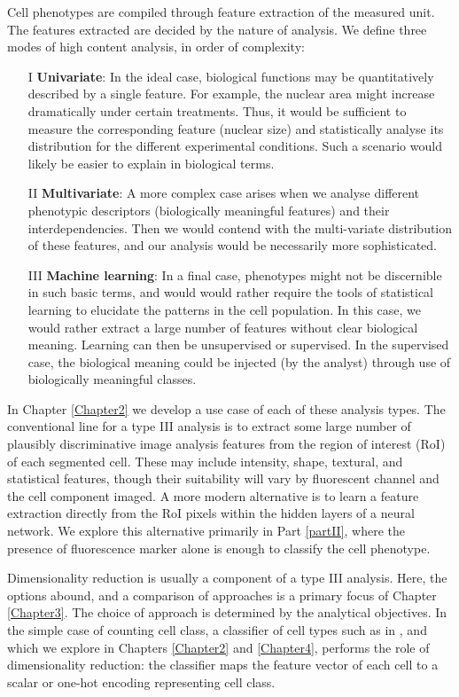 Cell phenotypes are compiled through feature extraction of the measured unit. The features extracted are decided by the nature of analysis. We define three modes of high content analysis, in order of complexity:

\begin{itemize}
\item[I] \textbf{Univariate}: In the ideal case, biological functions may be quantitatively described by a single feature. For example, the nuclear area might increase dramatically under certain treatments. Thus, it would be sufficient to measure the corresponding feature (nuclear size) and statistically analyse its distribution for the different experimental conditions. Such a scenario would likely be easier to explain in biological terms.
\item[II] \textbf{Multivariate}: A more complex case arises when we analyse different phenotypic descriptors (biologically meaningful features) and their interdependencies. Then we would contend with the multi-variate distribution of these features, and our analysis would be necessarily more sophisticated.
\item[III] \textbf{Machine learning}: In a final case, phenotypes might not be discernible in such basic terms, and would would rather require the tools of statistical learning to elucidate the patterns in the cell population. In this case, we would rather extract a large number of features without clear biological meaning. Learning can then be unsupervised or supervised. In the supervised case, the biological meaning could be injected (by the analyst) through use of biologically meaningful classes.
\end{itemize}

In Chapter \ref{Chapter2} we develop a use case of each of these analysis types. The conventional line for a type III analysis is to extract some large number of plausibly discriminative image analysis features from the region of interest (RoI) of each segmented cell. These may include intensity, shape, textural, and statistical features, though their suitability will vary by fluorescent channel and the cell component imaged. A more modern alternative is to learn a feature extraction directly from the RoI pixels within the hidden layers of a neural network. We explore this alternative primarily in Part \ref{partII}, where the presence of fluorescence marker alone is enough to classify the cell phenotype.

Dimensionality reduction is usually a component of a type III analysis. Here, the options abound, and a comparison of approaches is a primary focus of Chapter \ref{Chapter3}. The choice of approach is determined by the analytical objectives. In the simple case of counting cell class, a classifier of cell types such as in \cite{neumann2010phenotypic}, and which we explore in Chapters \ref{Chapter2} and \ref{Chapter4}, performs the role of dimensionality reduction: the classifier maps the feature vector of each cell to a scalar or one-hot encoding representing cell class.

